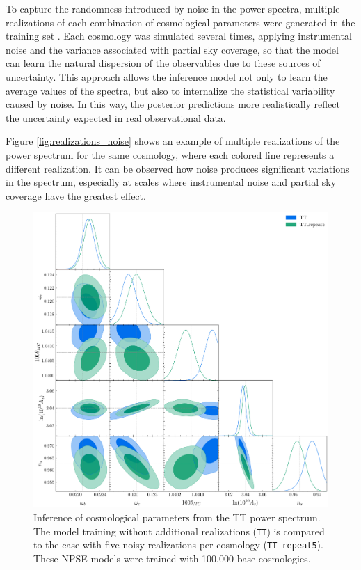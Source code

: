 To capture the randomness introduced by noise in the power spectra, multiple realizations of each combination of cosmological parameters were generated in the training set \cite{novaes}. Each cosmology was simulated several times, applying instrumental noise and the variance associated with partial sky coverage, so that the model can learn the natural dispersion of the observables due to these sources of uncertainty. This approach allows the inference model not only to learn the average values of the spectra, but also to internalize the statistical variability caused by noise. In this way, the posterior predictions more realistically reflect the uncertainty expected in real observational data.

Figure \ref{fig:realizations_noise} shows an example of multiple realizations of the power spectrum for the same cosmology, where each colored line represents a different realization. It can be observed how noise produces significant variations in the spectrum, especially at scales where instrumental noise and partial sky coverage have the greatest effect.

\begin{figure}
    \centering
    \includegraphics[scale=0.35]{img/01_repeat_noise_comparison_100000.pdf}
    \caption{Inference of cosmological parameters from the TT power spectrum. The model training without additional realizations (\texttt{TT}) is compared to the case with five noisy realizations per cosmology (\texttt{TT repeat5}). These NPSE models were trained with 100,000 base cosmologies.}
    \label{fig:inference_with_noise}
\end{figure}

